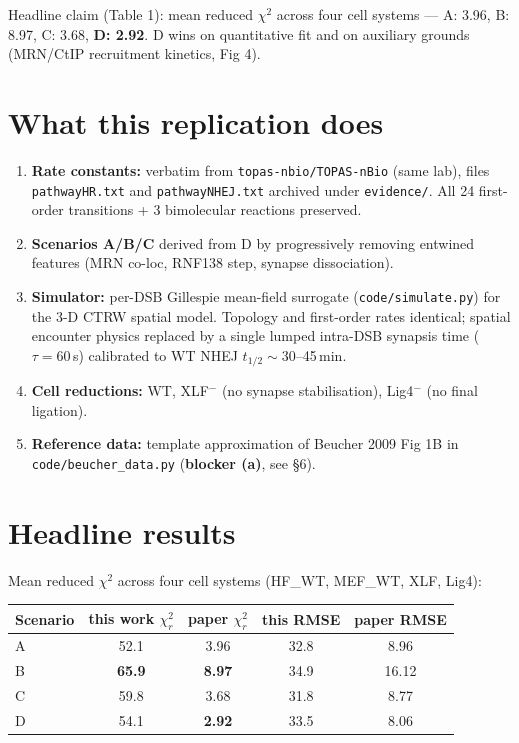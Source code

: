 \documentclass[11pt]{article}
\begin{document}
Headline claim (Table 1): mean reduced $\chi^2$
across four cell systems --- A: 3.96, B: 8.97, C: 3.68,
\textbf{D: 2.92}. D wins on quantitative fit and on auxiliary
grounds (MRN/CtIP recruitment kinetics, Fig 4).

\section{What this replication does}
\begin{enumerate}[leftmargin=*, itemsep=2pt]
  \item \textbf{Rate constants:} verbatim from
    \texttt{topas-nbio/TOPAS-nBio} (same lab), files
    \texttt{pathwayHR.txt} and \texttt{pathwayNHEJ.txt} archived
    under \texttt{evidence/}. All 24 first-order transitions + 3
    bimolecular reactions preserved.
  \item \textbf{Scenarios A/B/C} derived from D by progressively
    removing entwined features (MRN co-loc, RNF138 step, synapse
    dissociation).
  \item \textbf{Simulator:} per-DSB Gillespie mean-field surrogate
    (\texttt{code/simulate.py}) for the 3-D CTRW spatial model.
    Topology and first-order rates identical; spatial encounter
    physics replaced by a single lumped intra-DSB synapsis time
    ($\tau=60$\,s) calibrated to WT NHEJ $t_{1/2}\!\sim\!30$--45\,min.
  \item \textbf{Cell reductions:} WT, XLF$^-$ (no synapse
    stabilisation), Lig4$^-$ (no final ligation).
  \item \textbf{Reference data:} template approximation of Beucher
    2009 Fig 1B in \texttt{code/beucher\_data.py}
    (\textbf{blocker (a)}, see \S6).
\end{enumerate}

\section{Headline results}
Mean reduced $\chi^2$ across four cell systems
(HF\_WT, MEF\_WT, XLF, Lig4):
\begin{center}
\begin{tabular}{lcccc}
\toprule
Scenario & this work $\chi^2_r$ & paper $\chi^2_r$ & this RMSE & paper RMSE \\
\midrule
A & 52.1 & 3.96 & 32.8 & 8.96 \\
B & \textbf{65.9} & \textbf{8.97} & 34.9 & 16.12 \\
C & 59.8 & 3.68 & 31.8 & 8.77 \\
D & 54.1 & \textbf{2.92} & 33.5 & 8.06 \\
\bottomrule
\end{tabular}
\end{center}
\end{document}
